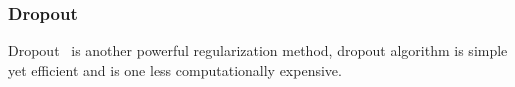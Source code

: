 \subsubsection{Dropout}

Dropout~\cite{JMLR:v15:srivastava14a} is another powerful regularization method, dropout algorithm is simple yet efficient and is one  less computationally expensive. 